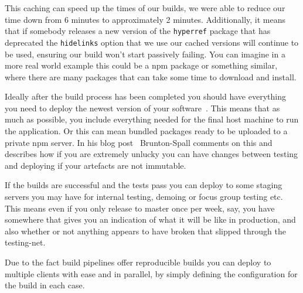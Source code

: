 This caching can speed up the times of our builds, we were able to reduce our time down from 6 minutes to approximately 2 minutes.
Additionally, it means that if somebody releases a new version of the \texttt{hyperref} package that has deprecated the \texttt{hidelinks}
option that we use our cached versions will continue to be used, ensuring our build won't start passively failing.
You can imagine in a more real world example this could be a npm package or something similar,
where there are many packages that can take some time to download and install.
\par
Ideally after the build process has been completed you should have everything you need to deploy the newest version of your software~\cite{BruntonBuild}.
This means that as much as possible, you include everything needed for the final host machine to run the application.
Or this can mean bundled packages ready to be uploaded to a private npm server.
In his blog post~\cite{BruntonBuild} Brunton-Spall comments on this and describes
how if you are extremely unlucky you can have changes between testing and deploying if your artefacts are not immutable.
\par
If the builds are successful and the tests pass you can deploy to some staging servers you may have for internal testing, demoing or focus group testing etc.
This means even if you only release to master once per week, say,
you have somewhere that gives you an indication of what it will be like in production,
and also whether or not anything appears to have broken that slipped through the testing-net.
\par
Due to the fact build pipelines offer reproducible builds you can deploy to multiple clients with ease and in parallel,
by simply defining the configuration for the build in each case.
